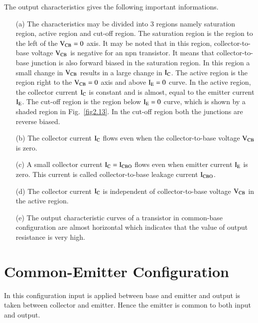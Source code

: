 The output characteristics gives the following important informations.
\begin{itemize}
\item[(a)] The characteristics may be divided into 3 regions namely saturation region, active region and cut-off region. The saturation region is the region to the left of the $\textrm{V}_{\text{CB}}=0$ axis. It may be noted that in this region, collector-to-base voltage $\textrm{V}_{\text{CB}}$ is negative for an npn transistor. It means that collector-to-base junction is also forward biased in the saturation region. In this region a small change in $\textrm{V}_{\text{CB}}$ results in a large change in $\textrm{I}_{\textrm{C}}$. The active region is the region right to the $\textrm{V}_{\text{CB}}=0$ axis and above $\textrm{I}_{\textrm{E}}=0$ curve. In the active region, the collector current $\textrm{I}_{\textrm{C}}$ is constant and is almost, equal to the emitter current $\textrm{I}_{\textrm{E}}$. The cut-off region is the region below $\textrm{I}_{\textrm{E}}=0$ curve, which is shown by a shaded region in Fig.~\ref{fig2.13}. In the cut-off region both the junctions are reverse biased.

\item[(b)] The collector current $\textrm{I}_{\textrm{C}}$ flows even when the collector-to-base voltage $\textrm{V}_{\text{CB}}$ is zero.

\item[(c)] A small collector current $\textrm{I}_{\textrm{C}}=\textrm{I}_{\text{CBO}}$ flows even when emitter current $\textrm{I}_{\textrm{E}}$ is zero. This current is called collector-to-base leakage current $\textrm{I}_{\text{CBO}}$.

\item[(d)] The collector current $\textrm{I}_{\textrm{C}}$ is independent of collector-to-base voltage $\textrm{V}_{\text{CB}}$ in the active region.

\item[(e)] The output characteristic curves of a transistor in common-base configuration are almost horizontal which indicates that the value of output resistance is very high.
\end{itemize}

\section{Common-Emitter Configuration}\label{sec2.5}

In this configuration input is applied between base and emitter and output is taken between collector and emitter. Hence the emitter is common to both input and output.

